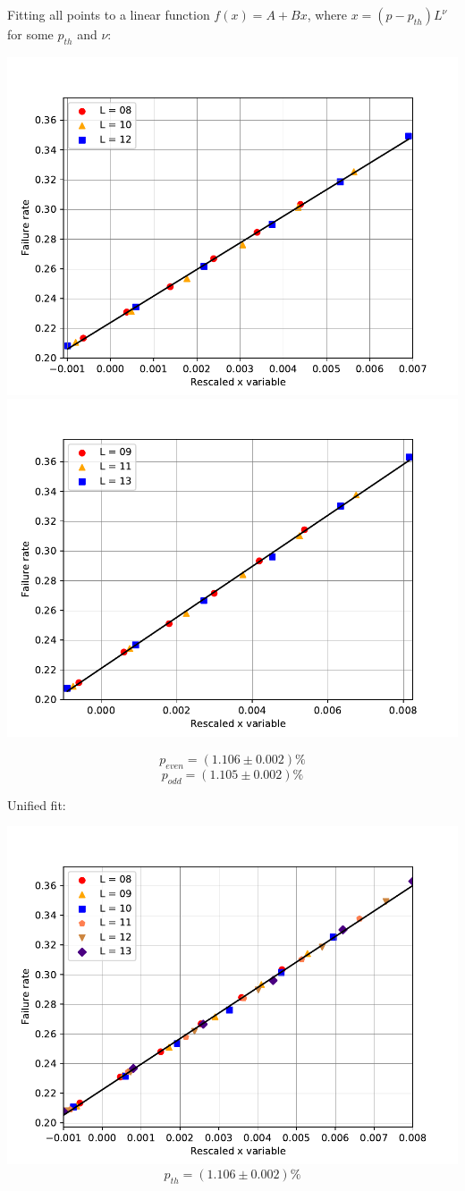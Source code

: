 \documentclass[pra]{revtex4-1}
\begin{document}
\noindent Fitting all points to a linear function $f(x) = A + Bx$, where $x=(p-p_{th})L^{\nu}$ for some $p_{th}$ and $\nu$: 
  
\includegraphics[width=.49\textwidth]{../graphs-paper2/tfa-dephasing-even-rescaled.pdf}
\includegraphics[width=.49\textwidth]{../graphs-paper2/tfa-dephasing-odd-rescaled.pdf}

\[  p_{even} = (1.106 \pm 0.002)\% \]
\[  p_{odd} = (1.105 \pm 0.002)\% \]
\clearpage 

Unified fit: \begin{center} 

\includegraphics[width=.9\textwidth]{../graphs-paper2/tfa-dephasing-rescaled.pdf}
\[  p_{th} = (1.106 \pm 0.002)\% \] \end{center}
\clearpage 
\end{document}
